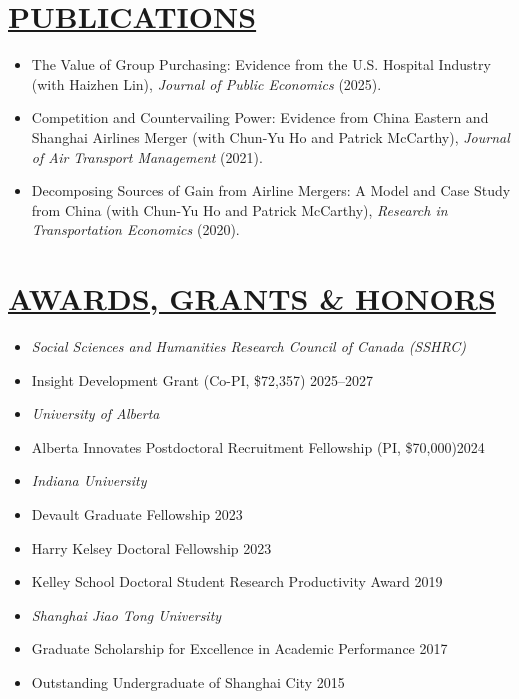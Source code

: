 \documentclass{res}
\begin{document}
\begin{resume}
\section{\large{\ul{PUBLICATIONS}}}
\vspace{1.8em}
\begin{itemize}[leftmargin=15pt,labelindent=-15pt,itemindent=-15pt,itemsep=0.1em]
    \item[] The Value of Group Purchasing: Evidence from the U.S. Hospital Industry (with Haizhen Lin), \textit{Journal of Public Economics} (2025).
    \item[] Competition and Countervailing Power: Evidence from China Eastern and Shanghai Airlines Merger (with Chun-Yu Ho and Patrick McCarthy), \textit{Journal of Air Transport Management} (2021).
    \item[] Decomposing Sources of Gain from Airline Mergers: A Model and Case Study from China (with Chun-Yu Ho and Patrick McCarthy), \textit{Research in Transportation Economics} (2020).
\end{itemize}

\section{\large{\ul{AWARDS, GRANTS \& HONORS}}}
\vspace{1.8em}
\begin{itemize}[leftmargin=15pt,labelindent=-15pt,itemindent=-15pt,itemsep=0.1em]
  \item[] \textit{Social Sciences and Humanities Research Council of Canada (SSHRC)}
      \item[] \hspace{13pt} Insight Development Grant (Co-PI, \$72,357) \hfill 2025--2027
\item[] \textit{University of Alberta}
    \item[] \hspace{13pt} Alberta Innovates Postdoctoral Recruitment Fellowship (PI, \$70,000)\hfill 2024
\item[] \textit{Indiana University}
    \item[] \hspace{13pt} Devault Graduate Fellowship \hfill 2023
    \item[] \hspace{13pt} Harry Kelsey Doctoral Fellowship \hfill 2023
    \item[] \hspace{13pt} Kelley School Doctoral Student Research Productivity Award \hfill 2019
\item[] \textit{Shanghai Jiao Tong University}
    \item[] \hspace{13pt} Graduate Scholarship for Excellence in Academic Performance \hfill 2017
    \item[] \hspace{13pt} Outstanding Undergraduate of Shanghai City \hfill 2015
\end{itemize}


\end{resume}
\end{document}
